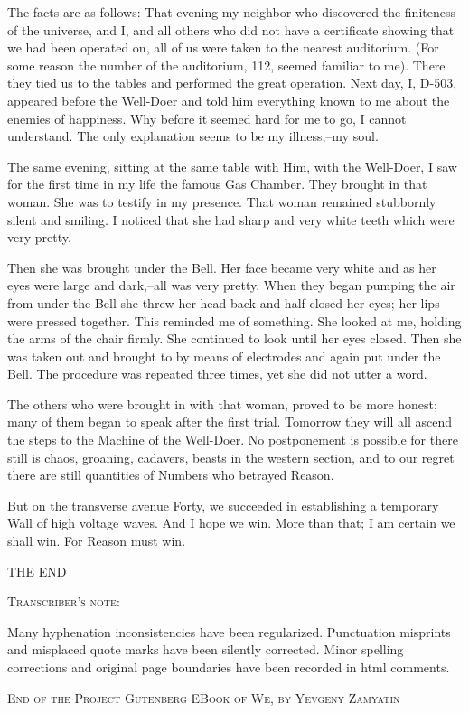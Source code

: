 \documentclass[11pt,openany]{book}
\begin{document}
The facts are as follows: That evening my neighbor who discovered the finiteness of the universe, and I, and all others who did not have a certificate showing that we had been operated on, all of us were taken to the nearest auditorium. (For some reason the number of the auditorium, 112, seemed familiar to me). There they tied us to the tables and performed the great operation. Next day, I, D-503, appeared before the Well-Doer and told him everything known to me about the enemies of happiness. Why before it seemed hard for me to go, I cannot understand. The only explanation seems to be my illness,--my soul.

The same evening, sitting at the same table with Him, with the Well-Doer, I saw for the first time in my life the famous Gas Chamber. They brought in that woman. She was to testify in my presence. That woman remained stubbornly silent and smiling. I noticed that she had sharp and very white teeth which were very pretty.

Then she was brought under the Bell. Her face became very white and as her eyes were large and dark,--all was very pretty. When they began pumping the air from under the Bell she threw her head back and half closed her eyes; her lips were pressed together. This reminded me of something. She looked at me, holding the arms of the chair firmly. She continued to look until her eyes closed. Then she was taken out and brought to by means of electrodes and again put under the Bell. The procedure was repeated three times, yet she did not utter a word.

The others who were brought in with that woman, proved to be more honest; many of them began to speak after the first trial. Tomorrow they will all ascend the steps to the Machine of the Well-Doer. No postponement is possible for there still is chaos, groaning, cadavers, beasts in the western section, and to our regret there are still quantities of Numbers who betrayed Reason.

But on the transverse avenue Forty, we succeeded in establishing a temporary Wall of high voltage waves. And I hope we win. More than that; I am certain we shall win. For Reason must win.

\begin{center}\textsc{THE END}\end{center}

\begin{center}\textsc{Transcriber's note:}\end{center}

Many hyphenation inconsistencies have been regularized. Punctuation misprints and misplaced quote marks have been silently corrected. Minor spelling corrections and original page boundaries have been recorded in html comments.

\begin{center}\textsc{End of the Project Gutenberg EBook of We, by Yevgeny Zamyatin}\end{center}
\end{document}
